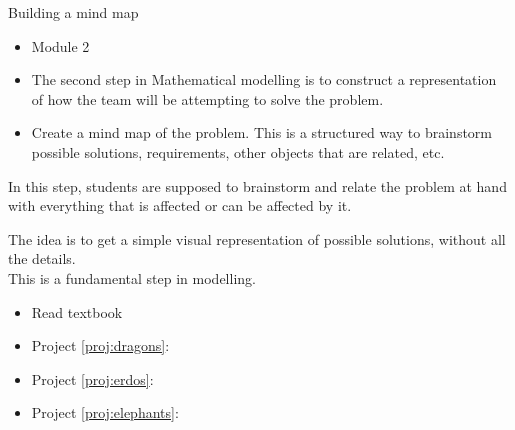\standardonlynewpage


%
%



\begin{module}{Building a mind map}
	\label{mindmap}

	
	
\end{module}



\begin{lesson}


	\begin{itemize}
		\item Module 2
	\end{itemize}

	\begin{itemize}

		\item The second step in Mathematical modelling is to construct a representation of how the team will be attempting to solve the problem.

		\item Create a mind map of the problem. This is a structured way to brainstorm possible solutions, requirements, other objects that are related, etc.
	\end{itemize}
	

In this step, students are supposed to brainstorm and relate the problem at hand with everything that is affected or can be affected by it.

The idea is to get a simple visual representation of possible solutions, without all the details. \\

This is a fundamental step in modelling.


\begin{itemize}
	\item Read textbook
\end{itemize}


\begin{itemize}
	\item Project \ref{proj:dragons}: \dragonstitle
	\item Project \ref{proj:erdos}: \erdostitle
	\item Project \ref{proj:elephants}: \elephantstitle
\end{itemize}



\end{lesson}
